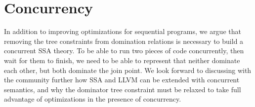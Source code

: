 \documentclass[a4paper,twocolumn]{article}
\begin{document}
\section*{Concurrency}
In addition to improving optimizations for sequential programs, we argue that 
removing the tree constraints from domination relations is necessary to build a
concurrent SSA theory. To be able to run two pieces of code concurrently, then
wait for them to finish, we need to be able to represent that neither dominate
each other, but both dominate the join point. We look forward to discussing
with the community further how SSA and LLVM can be extended with concurrent
semantics, and why the dominator tree constraint must be relaxed to take full
advantage of optimizations in the presence of concurrency.
\end{document}
